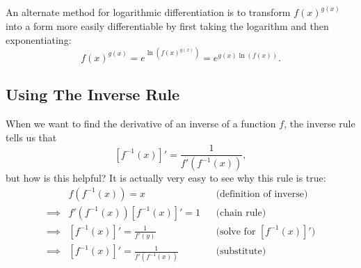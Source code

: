 An alternate method for logarithmic differentiation is to transform $f(x)^{g(x)}$ into a form more easily differentiable by first taking the logarithm and then exponentiating:
$$f(x)^{g(x)}=e^{\ln\left(f(x)^{g(x)}\right)}=e^{g(x)\ln(f(x))}.$$
\subsection{Using The Inverse Rule}

When we want to find the derivative of an inverse of a function $f$, the inverse rule tells us that
$$[f^{-1}(x)]'=\frac{1}{f'(f^{-1}(x))},$$
but how is this helpful? It is actually very easy to see why this rule is true:
\begin{align*}
         & f(f^{-1}(x)) = x & & \text{(definition of inverse)}\\
\implies & f'(f^{-1}(x))[f^{-1}(x)]'=1 & &\text{(chain rule)}\\
\implies & [f^{-1}(x)]' = \frac{1}{f'(y)} & & \text{(solve for $[f^{-1}(x)]'$)}\\
\implies & [f^{-1}(x)]' =\frac{1}{f'(f^{-1}(x))} & & \text{(substitute)}
\end{align*}

